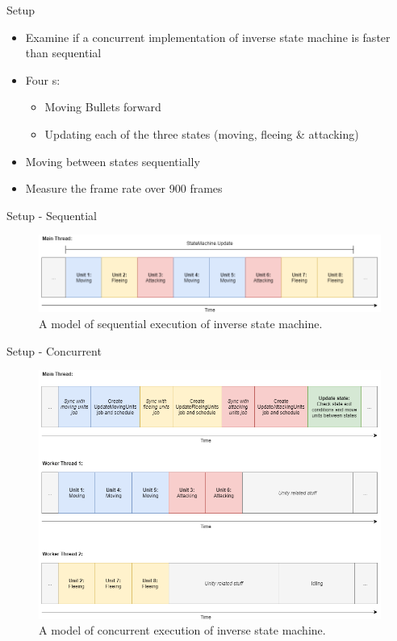 \begin{frame}{\secname}{\subsecname}
	Setup
	\begin{itemize}
		\item Examine if a concurrent implementation of inverse state machine is faster than sequential
		\item Four s:
		\begin{itemize}
			\item Moving Bullets forward
			\item Updating each of the three states (moving, fleeing \& attacking)
		\end{itemize}
		\item Moving between states sequentially
		\item Measure the frame rate over 900 frames
	\end{itemize}
\end{frame}

\begin{frame}{\secname}{\subsecname}
	Setup - Sequential
	\begin{figure}[h!]
        \centering
        \includegraphics[width=\textwidth]{pictures/sequential.png}
        \caption{A model of sequential execution of inverse state machine.}
    \end{figure}
\end{frame}

\begin{frame}{\secname}{\subsecname}
	Setup - Concurrent
	\begin{figure}[h!]
        \centering
        \includegraphics[width=.7\textwidth]{pictures/concurrent.png}
        \caption{A model of concurrent execution of inverse state machine.}
    \end{figure}
\end{frame}

